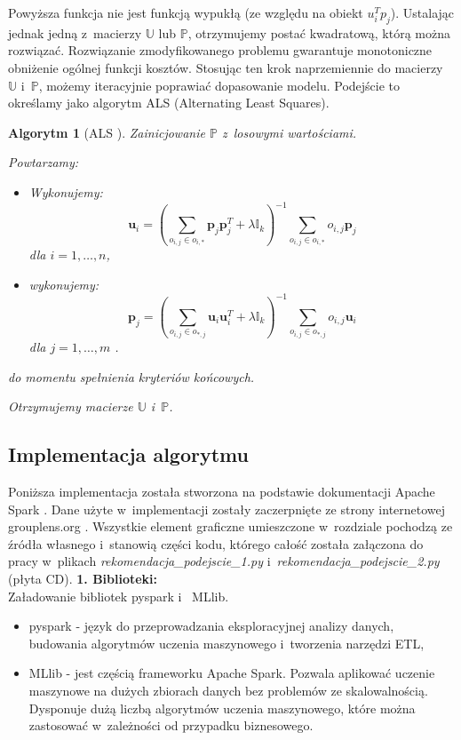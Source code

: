 \documentclass[12pt,a4paper]{report}
\newtheorem{algorytm}[df]{Algorytm}
\begin{document}
Powyższa funkcja nie jest funkcją wypukłą (ze względu na obiekt $u_i^Tp_j$). Ustalając jednak jedną z~macierzy $\mathbb{U}$ lub $\mathbb{P}$, otrzymujemy postać kwadratową, którą można rozwiązać. Rozwiązanie zmodyfikowanego problemu gwarantuje monotoniczne obniżenie ogólnej funkcji kosztów. Stosując ten krok naprzemiennie do macierzy $\mathbb{U}$ i~$\mathbb{P}$, możemy iteracyjnie poprawiać dopasowanie modelu. Podejście to określamy jako algorytm ALS (Alternating Least Squares).

\begin{algorytm}[ALS {\citep{mcvals}}]
Zainicjowanie $\mathbb{P}$ z~losowymi wartościami.

Powtarzamy:
\begin{itemize}
\item Wykonujemy:
$$
\mathbf{u}_i = (\sum_{o_{i,j} \in o_{i,*}} \mathbf{p}_j \mathbf{p}_j^T + \lambda \mathbb{I}_k)^{-1} \sum_{o_{i,j} \in o_{i,*}} o_{i,j}\mathbf{p}_j
$$
dla $i = 1, \ldots, n $,
\item wykonujemy:
$$
\mathbf{p}_j = (\sum_{o_{i,j} \in o_{*,j}} \mathbf{u}_i \mathbf{u}_i^T + \lambda \mathbb{I}_k)^{-1} \sum_{o_{i,j} \in o_{*,j}} o_{i,j}\mathbf{u}_i
$$
dla $j = 1, \ldots, m$ .
\end{itemize}
do momentu spełnienia kryteriów końcowych.

Otrzymujemy macierze $\mathbb{U}$ i~$\mathbb{P}$.
\end{algorytm}

\subsection{Implementacja algorytmu}
Poniższa implementacja została stworzona na podstawie dokumentacji Apache Spark {\citep{apache}}. Dane użyte w~implementacji zostały zaczerpnięte ze strony internetowej grouplens.org {\citep{dane}}. Wszystkie element graficzne umieszczone w~rozdziale pochodzą ze źródła własnego i~stanowią części kodu, którego całość została załączona do pracy w~plikach \textit{rekomendacja\_podejscie\_1.py} i~\textit{rekomendacja\_podejscie\_2.py} (płyta CD).
\bigskip
\textbf{1. Biblioteki:}
\\Załadowanie bibliotek pyspark i~ MLlib.
\begin{itemize}
\item pyspark - język do przeprowadzania eksploracyjnej analizy danych, budowania algorytmów uczenia maszynowego i~tworzenia narzędzi ETL,
\item MLlib - jest częścią frameworku Apache Spark. Pozwala aplikować uczenie maszynowe na dużych zbiorach danych bez problemów ze skalowalnością. Dysponuje dużą liczbą algorytmów uczenia maszynowego, które można zastosować w~zależności od przypadku biznesowego.
\end{itemize}
\end{document}
